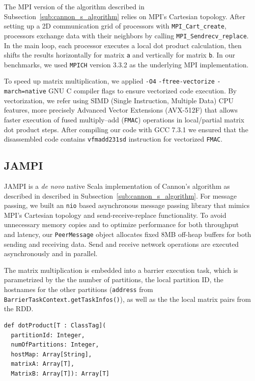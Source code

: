 \documentclass[fleqn,10pt]{SelfArx} %
\begin{document}
The MPI version of the algorithm described in Subsection~\ref{sub:cannon_s_algorithm} relies on MPI's Cartesian topology. After setting up a 2D communication grid of processors with \texttt{MPI\_Cart\_create}, processors exchange data with their neighbors by calling \texttt{MPI\_Sendrecv\_replace}. In the main loop, each processor executes a local dot product calculation, then shifts the results horizontally for matrix \texttt{a} and vertically for matrix \texttt{b}. In our benchmarks, we used \texttt{MPICH} version 3.3.2 as the underlying MPI implementation.

To speed up matrix multiplication, we applied \texttt{-O4} \texttt{-ftree-vectorize} \texttt{-march=native} GNU C compiler flags to ensure vectorized code execution. By vectorization, we refer using SIMD (Single Instruction, Multiple Data) CPU features, more precisely Advanced Vector Extensions (AVX-512F) that allows faster execution of fused multiply–add (\texttt{{FMAC}}) operations in local/partial matrix dot product steps. After compiling our code with GCC 7.3.1 we ensured that the disassembled code contains \texttt{vfmadd231sd} instruction for vectorized \texttt{FMAC}. 


\subsection{JAMPI} %
\label{sub:jampi_implementation}

JAMPI is a \emph{de novo} native Scala implementation of Cannon's algorithm as described in described in Subsection~\ref{sub:cannon_s_algorithm}. For message passing, we built an \texttt{nio} based asynchronous message passing library that mimics MPI's Cartesian topology and send-receive-replace functionality. To avoid unnecessary memory copies and to optimize performance for both throughput and latency, our \texttt{PeerMessage} object allocates fixed 8MB off-heap buffers for both sending and receiving data. Send and receive network operations are executed asynchronously and in parallel.

The matrix multiplication is embedded into a barrier execution task, which is parametrized by the the number of partitions, the local partition ID, the hostnames for the other partitions (\texttt{address} from \texttt{BarrierTaskContext.getTaskInfos()}), as well as the  the local matrix pairs from the RDD.

\begin{lstlisting}
def dotProduct[T : ClassTag](
  partitionId: Integer,
  numOfPartitions: Integer,
  hostMap: Array[String],
  matrixA: Array[T],
  MatrixB: Array[T]): Array[T] 
\end{lstlisting}
\end{document}

